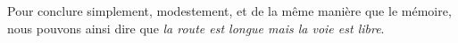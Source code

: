 \documentclass[11pt]{article}
\begin{document}
Pour conclure simplement, modestement, et de la même manière que le mémoire, nous pouvons ainsi dire que \textit{la route est longue mais la voie est libre}.











%
\end{document}
